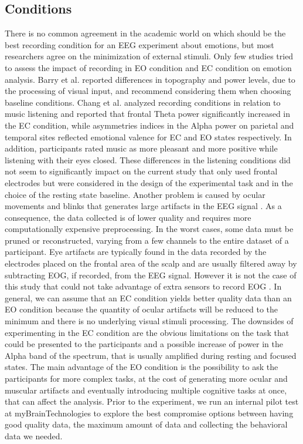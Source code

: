 \subsection{Conditions}
\label{sec:conditions}
There is no common agreement in the academic world on which should be the best recording condition for an \ac{EEG} experiment about emotions, but most researchers agree on the minimization of external stimuli. Only few studies tried to assess the impact of recording in \ac{EO} condition and \ac{EC} condition on emotion analysis. Barry et al. reported \cite{barry_eeg_2007} differences in topography and power levels, due to the processing of visual input, and recommend considering them when choosing baseline conditions. Chang et al. \cite{chang_experiencing_2015} analyzed recording conditions in relation to music listening and reported that frontal Theta power significantly increased in the EC condition, while asymmetries indices in the Alpha power on parietal and temporal sites reflected emotional valence for \ac{EC} and \ac{EO} states respectively. In addition, participants rated music as more pleasant and more positive while listening with their eyes closed. These differences in the listening conditions did not seem to significantly impact on the current study that only used frontal electrodes but were considered in the design of the experimental task and in the choice of the resting state baseline. Another problem is caused by ocular movements and blinks that generates large artifacts in the EEG signal \cite{hagemann_effects_2001}. As a consequence, the data collected is of lower quality and requires more computationally expensive preprocessing. In the worst cases, some data must be pruned or reconstructed, varying from a few channels to the entire dataset of a participant. Eye artifacts are typically found in the data recorded by the electrodes placed on the frontal area of the scalp and are usually filtered away by subtracting \ac{EOG}, if recorded, from the \ac{EEG} signal. However it is not the case of this study that could not take advantage of extra sensors to record \ac{EOG} . In general, we can assume that an \ac{EC} condition yields better quality data than an \ac{EO} condition because the quantity of ocular artifacts will be reduced to the minimum and there is no underlying visual stimuli processing. The downsides of experimenting in the \ac{EC} condition are the obvious limitations on the task that could be presented to the participants and a possible increase of power in the Alpha band of the spectrum, that is usually amplified during resting and focused states. The main advantage of the \ac{EO} condition is the possibility to ask the participants for more complex tasks, at the cost of generating more ocular and muscular artifacts and eventually introducing multiple cognitive tasks at once, that can affect the analysis. Prior to the experiment, we run an internal pilot test at myBrainTechnologies to explore the best compromise options between having good quality data, the maximum amount of data and collecting the behavioral data we needed.
